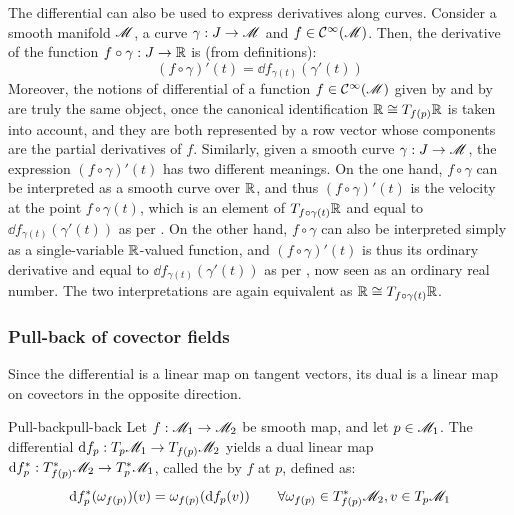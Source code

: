 The differential can also be used to express derivatives along curves. Consider a smooth manifold $ \mathscr{M} $, a curve $ \gamma : J \rightarrow \mathscr{M} $ and $ f \in \mathcal{C}^{\infty}(\mathscr{M}) $. Then, the derivative of the function $ f \circ \gamma : J \rightarrow \mathbb{R} $ is (from definitions):
\begin{equation}
  (f \circ \gamma)'(t) = \dd f_{\gamma(t)}(\gamma'(t))
  \label{eq:composite-curve-function}
\end{equation}
Moreover, the notions of differential of a function $ f \in \mathcal{C}^{\infty}(\mathscr{M}) $ given by  and by  are truly the same object, once the canonical identification $ \mathbb{R} \cong T_{f(p)}\mathbb{R} $ is taken into account, and they are both represented by a row vector whose components are the partial derivatives of $ f $. Similarly, given a smooth curve $ \gamma : J \rightarrow \mathscr{M} $, the expression $ (f \circ \gamma)'(t) $ has two different meanings. On the one hand, $ f \circ \gamma $ can be interpreted as a smooth curve over $ \mathbb{R} $, and thus $ (f \circ \gamma)'(t) $ is the velocity at the point $ f \circ \gamma(t) $, which is an element of $ T_{f \circ \gamma(t)}\mathbb{R} $ and equal to $ \dd f_{\gamma(t)}(\gamma'(t)) $ as per . On the other hand, $ f \circ \gamma $ can also be interpreted simply as a single-variable $ \mathbb{R} $-valued function, and $ (f \circ \gamma)'(t) $ is thus its ordinary derivative and equal to $ \dd f_{\gamma(t)}(\gamma'(t)) $ as per , now seen as an ordinary real number. The two interpretations are again equivalent as $ \mathbb{R} \cong T_{f \circ \gamma(t)}\mathbb{R} $.

\subsubsection{Pull-back of covector fields}

Since the differential is a linear map on tangent vectors, its dual is a linear map on covectors in the opposite direction.

\begin{definition}{Pull-back}{pull-back}
  Let $ f : \mathscr{M}_1 \rightarrow \mathscr{M}_2 $ be smooth map, and let $ p \in \mathscr{M}_1 $. The differential $ \mathrm{d} f_p : T_p\mathscr{M}_1 \rightarrow T_{f(p)}\mathscr{M}_2 $ yields a dual linear map $ \mathrm{d} f_p^* : T_{f(p)}^*\mathscr{M}_2 \rightarrow T_p^*\mathscr{M}_1 $, called the  by $ f $ at $ p $, defined as:
  \begin{equation}
    \mathrm{d} f_p^*(\omega_{f(p)})(v) = \omega_{f(p)}(\mathrm{d} f_p(v))
    \qquad
    \forall \omega_{f(p)} \in T_{f(p)}^*\mathscr{M}_2 , v \in T_p\mathscr{M}_1
    \label{eq:pull-back-def}
  \end{equation}
\end{definition}

